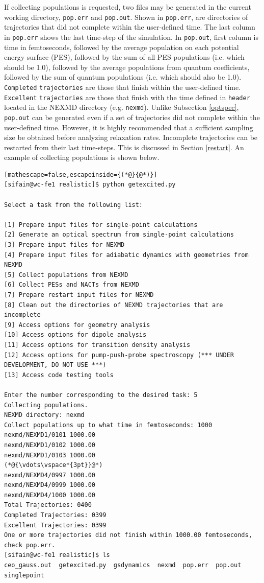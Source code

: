\documentclass[letterpaper,12pt,titlepage]{article}
\begin{document}
If collecting populations is requested, two files may be generated in the current working directory, \verb+pop.err+ and \verb+pop.out+.  Shown in \verb+pop.err+, are directories of trajectories that did not complete within the user-defined time.  The last column in \verb+pop.err+ shows the last time-step of the simulation.  In \verb+pop.out+, first column is time in femtoseconds, followed by the average population on each potential energy surface (PES), followed by the sum of all PES populations (i.e. which should be 1.0), followed by the average populations from quantum coefficients, followed by the sum of quantum populations (i.e. which should also be 1.0).  \verb+Completed+ \verb+trajectories+ are those that finish within the user-defined time.  \verb+Excellent+ \verb+trajectories+ are those that finish with the time defined in \verb+header+ located in the NEXMD directory (e.g. \verb+nexmd+).  Unlike Subsection \ref{optspec}, \verb+pop.out+ can be generated even if a set of trajectories did not complete within the user-defined time.  However, it is highly recommended that a sufficient sampling size be obtained before analyzing relaxation rates.  Incomplete trajectories can be restarted from their last time-steps.  This is discussed in Section \ref{restart}.  An example of collecting populations is shown below.
\begin{lstlisting}[mathescape=false,escapeinside={(*@}{@*)}]
[sifain@wc-fe1 realistic]$ python getexcited.py 

Select a task from the following list:

[1] Prepare input files for single-point calculations
[2] Generate an optical spectrum from single-point calculations
[3] Prepare input files for NEXMD
[4] Prepare input files for adiabatic dynamics with geometries from NEXMD
[5] Collect populations from NEXMD
[6] Collect PESs and NACTs from NEXMD
[7] Prepare restart input files for NEXMD
[8] Clean out the directories of NEXMD trajectories that are incomplete
[9] Access options for geometry analysis
[10] Access options for dipole analysis
[11] Access options for transition density analysis
[12] Access options for pump-push-probe spectroscopy (*** UNDER DEVELOPMENT, DO NOT USE ***)
[13] Access code testing tools

Enter the number corresponding to the desired task: 5
Collecting populations.
NEXMD directory: nexmd 
Collect populations up to what time in femtoseconds: 1000
nexmd/NEXMD1/0101 1000.00
nexmd/NEXMD1/0102 1000.00
nexmd/NEXMD1/0103 1000.00
(*@{\vdots\vspace*{3pt}}@*)
nexmd/NEXMD4/0997 1000.00
nexmd/NEXMD4/0999 1000.00
nexmd/NEXMD4/1000 1000.00
Total Trajectories: 0400
Completed Trajectories: 0399
Excellent Trajectories: 0399
One or more trajectories did not finish within 1000.00 femtoseconds, check pop.err.
[sifain@wc-fe1 realistic]$ ls
ceo_gauss.out  getexcited.py  gsdynamics  nexmd  pop.err  pop.out  singlepoint
\end{lstlisting}
\end{document}
